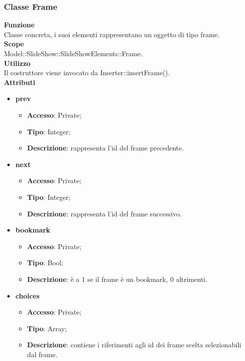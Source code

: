 {	\subsubsection{Classe Frame}{
		\label{Frame}
		\textbf{Funzione}\\
			\indent Classe concreta, i suoi elementi rappresentano un oggetto di tipo frame.\\
	   	\textbf{Scope}\\
			\indent Model::SlideShow::SlideShowElements::Frame.\\
		\textbf{Utilizzo}\\
			\indent Il costruttore viene invocato da Inserter::insertFrame().\\
		\textbf{Attributi}
		\begin{itemize}
			\item \textbf{prev}
			\begin{itemize}
				\item \textbf{Accesso}: Private;
				\item \textbf{Tipo}: Integer;
				\item \textbf{Descrizione}: rappresenta l’id del frame precedente.
			\end{itemize}
			\item \textbf{next}
			\begin{itemize}
				\item \textbf{Accesso}: Private;
				\item \textbf{Tipo}: Integer;
				\item \textbf{Descrizione}: rappresenta l’id del frame successivo.
			\end{itemize}
			\item \textbf{bookmark}
			\begin{itemize}
				\item \textbf{Accesso}: Private;
				\item \textbf{Tipo}: Bool;
				\item \textbf{Descrizione}: è a 1 se il frame è un bookmark, 0 altrimenti.
			\end{itemize}
			\item \textbf{choices}
			\begin{itemize}
				\item \textbf{Accesso}: Private;
				\item \textbf{Tipo}: Array;
				\item \textbf{Descrizione}: contiene i riferimenti agli id dei frame scelta selezionabili dal frame.
			\end{itemize}

\end{itemize}}}
